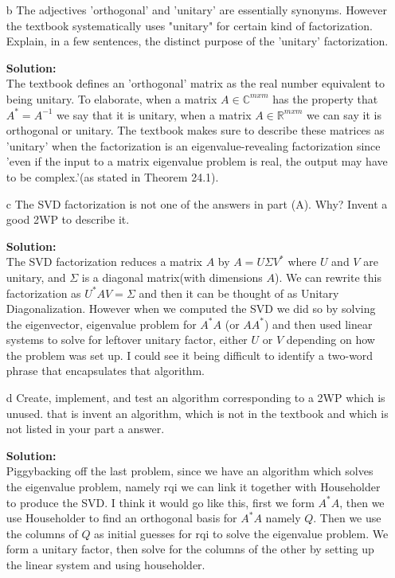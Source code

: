 \documentclass[12pt]{article}
\makeatletter
\theoremstyle{homework}
\newenvironment{exercise}[1]
{\def\@currentlabel{#1}\exercisecore}
{\endexercisecore}
\newcommand{\localhead}[1]{\par\smallskip\noindent\textbf{#1}\nobreak\\}%
\newcommand\solution{\localhead{Solution:}}
\newcommand{\Reals}{\ensuremath{\mathbb R}}
\newcommand{\Cplx}{\ensuremath{\mathbb C}}
\let\RR\Reals
\let\CC\Cplx
\makeatother
\begin{document}
\begin{exercise}{F1}
\begin{enumerate}
    \item[b] The adjectives 'orthogonal' and 'unitary' are essentially synonyms. However the textbook systematically uses "unitary" for certain kind of factorization. 
    Explain, in a few sentences, the distinct purpose of the 'unitary' factorization.\\
    \solution The textbook defines an 'orthogonal' matrix as the real number equivalent to being unitary. To elaborate, when a matrix $A \in \CC^{mxm}$ has the property that $A^* = A^{-1}$ we say that 
    it is unitary, when a matrix $A \in \RR^{mxm}$ we can say it is orthogonal or unitary. The textbook makes sure to describe these matrices as 'unitary' when the factorization is an eigenvalue-revealing 
    factorization since 'even if the input to a matrix eigenvalue problem is real, the output may have to be complex.'(as stated in Theorem 24.1).
    \vspace{.25in}

    \item[c] The SVD factorization is not one of the answers in part (A). Why? Invent a good 2WP to describe it.\\
    \solution The SVD factorization reduces a matrix $A$ by $A = U\Sigma V^*$ where $U$ and $V$ are unitary, and $\Sigma$ is a diagonal matrix(with dimensions $A$). We can rewrite this factorization as 
    $U^*A V = \Sigma$ and then it can be thought of as Unitary Diagonalization. However when we computed the SVD we did so by solving the eigenvector, eigenvalue problem for $A^*A$ (or $AA^*$) and then used linear 
    systems to solve for leftover unitary factor, either $U$ or $V$ depending on how the problem was set up. I could see it being difficult to identify a two-word phrase that encapsulates that algorithm. \\
    \vspace{.25in}

    \item[d] Create, implement, and test an algorithm corresponding to a 2WP which is unused. that is invent an algorithm, which is not in the textbook and which is not listed in your part a answer.\\
    \solution Piggybacking off the last problem, since we have an algorithm which solves the eigenvalue problem, namely rqi we can link it together with Householder to produce the SVD.
     I think it would go like this, first we form $A^*A$, then we use Householder to find an orthogonal basis for $A^*A$ namely $Q$. Then we use the columns of $Q$ as initial guesses for rqi to solve the eigenvalue problem. We form 
     a unitary factor, then solve for the columns of the other by setting up the linear system and using householder.  
    \end{enumerate}

\end{exercise}
\end{document}
